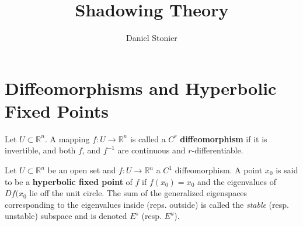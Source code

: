 \documentclass{article}
\title{Shadowing Theory}
\author{Daniel Stonier}
\begin{document}
\maketitle

\section{Diffeomorphisms and Hyperbolic Fixed Points}

\begin{defn}[Diffeomorphism]
Let $U \subset \mathbb{R}^n$. A mapping $f:U \to \mathbb{R}^n$ is
called a $C^r$ \textbf{diffeomorphism} if it is invertible, and
both $f$, and $f^{-1}$ are continuous and $r$-differentiable.
\end{defn}

\begin{defn}
Let $U \subset \mathbb{R}^n$ be an open set and $f:U \to
\mathbb{R}^n$ a $C^1$ diffeomorphism. A point $x_0$ is said to be
a \textbf{hyperbolic fixed point} of $f$ if $f(x_0) = x_0$ and the
eigenvalues of $Df(x_0$ lie off the unit circle. The sum of the
generalized eigenspaces corresponding to the eigenvalues inside
(reps. outside) is called the \emph{stable} (resp. unstable)
subspace and is denoted $E^s$ (resp. $E^u$).

\end{defn}
\end{document}
